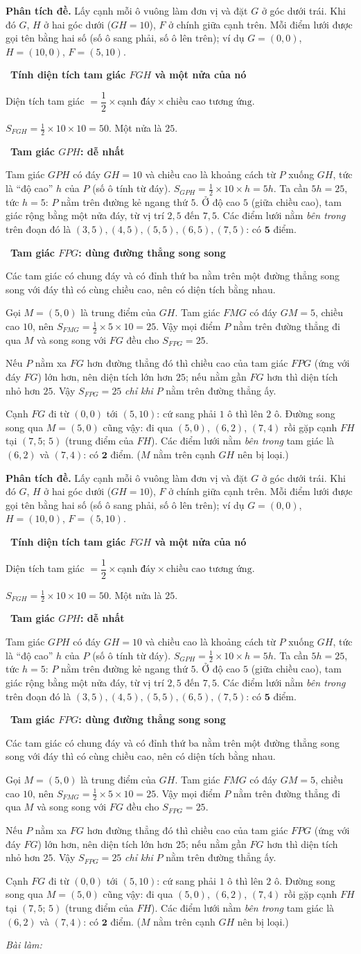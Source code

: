 \documentclass[11pt]{article}
\newif\ifsol \soltrue
\newcommand{\StuProb}[2]{\begin{probboxS}{#1}{#2}\StuProbBody\end{probboxS}}
\newcommand{\probsol}[1]{%
  \begin{lrbox}{\solmeasure}\begin{minipage}{\dimexpr\linewidth-24pt\relax}#1\end{minipage}\end{lrbox}%
  \ifsol
    \begin{solbox}#1\end{solbox}%
  \else
    \setlength{\solht}{\dimexpr\ht\solmeasure+\dp\solmeasure+0.85cm\relax}%
    \ifdim\solht<1.35cm\setlength{\solht}{1.35cm}\fi
    \ifdim\solht>\StudentMaxWork\setlength{\solht}{\StudentMaxWork}\fi
    \par\noindent\begin{minipage}{\linewidth}%
    \expandafter\StuProb\StuProbArgs
    \begin{tcolorbox}[colback=white,colframe=Line,boxrule=0.8pt,arc=5pt,
      left=8pt,right=8pt,top=4pt,bottom=4pt,height=\solht]{\footnotesize\color{Slate}\itshape\WorkWord}\end{tcolorbox}%
    \end{minipage}\par\medskip
  \fi}
\newlength{\StudentMaxWork}\setlength{\StudentMaxWork}{4.5cm}
\newcommand{\step}[2]{\par\smallskip\noindent{\bfseries\color{tmBlue!85!black}\StepWord~#1.}\ {\bfseries #2}\par\nopagebreak}
\def\WorkWord{Bài làm:}
\def\StepWord{Bước}
\begin{document}
\probsol{
\textbf{Phân tích đề.} Lấy cạnh mỗi ô vuông làm đơn vị và đặt $G$ ở góc dưới trái. Khi đó $G$, $H$ ở hai góc dưới
($GH=10$), $F$ ở chính giữa cạnh trên. Mỗi điểm lưới được gọi tên bằng hai số (số ô sang phải, số ô lên trên); ví dụ
$G=(0,0)$, $H=(10,0)$, $F=(5,10)$.

\step{1}{Tính diện tích tam giác $FGH$ và một nửa của nó}
\begin{recallbox}Diện tích tam giác $=\dfrac12\times\text{cạnh đáy}\times\text{chiều cao tương ứng}$.\end{recallbox}
$S_{FGH}=\frac12\times10\times10=50$. Một nửa là $25$.

\step{2}{Tam giác $GPH$: dễ nhất}
Tam giác $GPH$ có đáy $GH=10$ và chiều cao là khoảng cách từ $P$ xuống $GH$, tức là ``độ cao'' $h$ của $P$
(số ô tính từ đáy). $S_{GPH}=\frac12\times10\times h=5h$. Ta cần $5h=25$, tức $h=5$: $P$ nằm trên đường kẻ ngang
thứ $5$. Ở độ cao $5$ (giữa chiều cao), tam giác rộng bằng một nửa đáy, từ vị trí $2{,}5$ đến $7{,}5$. Các điểm lưới
nằm \emph{bên trong} trên đoạn đó là $(3,5),(4,5),(5,5),(6,5),(7,5)$: có $\mathbf{5}$ điểm.

\step{3}{Tam giác $FPG$: dùng đường thẳng song song}
\begin{recallbox}Các tam giác có chung đáy và có đỉnh thứ ba nằm trên một đường thẳng song song với đáy thì có
cùng chiều cao, nên có diện tích bằng nhau.\end{recallbox}
Gọi $M=(5,0)$ là trung điểm của $GH$. Tam giác $FMG$ có đáy $GM=5$, chiều cao $10$, nên $S_{FMG}=\frac12\times5\times10=25$.
Vậy mọi điểm $P$ nằm trên đường thẳng đi qua $M$ và song song với $FG$ đều cho $S_{FPG}=25$.
\begin{proofbox}Nếu $P$ nằm xa $FG$ hơn đường thẳng đó thì chiều cao của tam giác $FPG$ (ứng với đáy $FG$) lớn hơn, nên
diện tích lớn hơn $25$; nếu nằm gần $FG$ hơn thì diện tích nhỏ hơn $25$. Vậy $S_{FPG}=25$ \emph{chỉ khi} $P$ nằm trên
đường thẳng ấy.\end{proofbox}
Cạnh $FG$ đi từ $(0,0)$ tới $(5,10)$: cứ sang phải $1$ ô thì lên $2$ ô. Đường song song qua $M=(5,0)$ cũng vậy:
đi qua $(5,0)$, $(6,2)$, $(7,4)$ rồi gặp cạnh $FH$ tại $(7{,}5;\,5)$ (trung điểm của $FH$). Các điểm lưới nằm
\emph{bên trong} tam giác là $(6,2)$ và $(7,4)$: có $\mathbf{2}$ điểm. ($M$ nằm trên cạnh $GH$ nên bị loại.)

}
\end{document}
